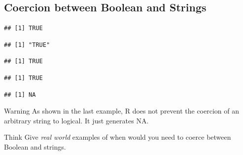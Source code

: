 \documentclass[12pt]{book}\usepackage{knitr}
\begin{document}
\subsection{Coercion between Boolean and Strings}
\begin{knitrout}
\color{fgcolor}\begin{kframe}
\begin{alltt}
\hlstd{(}\hlstd{)} 
\end{alltt}
\begin{verbatim}
## [1] TRUE
\end{verbatim}
\begin{alltt}
\hlstd{(}\hlstd{)} 
\end{alltt}
\begin{verbatim}
## [1] "TRUE"
\end{verbatim}
\begin{alltt}
\hlstd{(}\hlstd{)}  
\end{alltt}
\begin{verbatim}
## [1] TRUE
\end{verbatim}
\begin{alltt}
\hlstd{(}\hlstd{)} 
\end{alltt}
\begin{verbatim}
## [1] TRUE
\end{verbatim}
\begin{alltt}
\hlstd{(}\hlstd{)} 
\end{alltt}
\begin{verbatim}
## [1] NA
\end{verbatim}
\end{kframe}
\end{knitrout}
\begin{DIY}{Warning}
As shown in the last example, R does not prevent the coercion of an arbitrary string to logical. It just generates NA. 
\end{DIY}

\begin{DIY}{Think}
Give \emph{real world} examples of when would you need to coerce between Boolean and strings.
\end{DIY}
\end{document}

